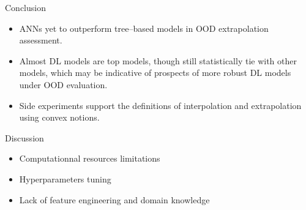 \begin{frame}{Conclusion}
    \begin{itemize}
        \item ANNs yet to outperform tree–based models in OOD extrapolation assessment.
        \item Almost DL models are top models, though still statistically tie with other models, which may be indicative of prospects of more robust DL models under OOD evaluation.
        \item Side experiments support the definitions of interpolation and extrapolation using convex notions.
    \end{itemize}
\end{frame}


\begin{frame}{Discussion}
    \begin{itemize}
        \item Computationnal resources limitations
        \item Hyperparameters tuning
        \item Lack of feature engineering and domain knowledge
    \end{itemize}
\end{frame}